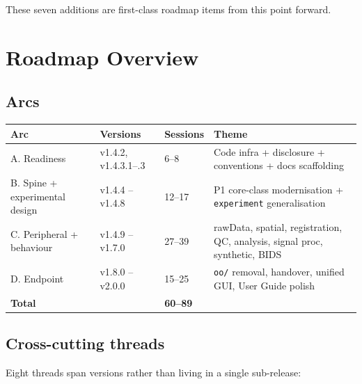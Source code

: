 \documentclass[11pt,a4paper]{article}
\begin{document}
These seven additions are first-class roadmap items from this point forward.

\section{Roadmap Overview}

\subsection{Arcs}

\begin{table}[h]
\centering
\begin{tabular}{llll}
\toprule
\textbf{Arc} & \textbf{Versions} & \textbf{Sessions} & \textbf{Theme} \\
\midrule
A. Readiness & v1.4.2, v1.4.3.1--.3 & 6--8 & Code infra + disclosure + conventions + docs scaffolding \\
B. Spine + experimental design & v1.4.4 -- v1.4.8 & 12--17 & P1 core-class modernisation + \texttt{experiment} generalisation \\
C. Peripheral + behaviour & v1.4.9 -- v1.7.0 & 27--39 & rawData, spatial, registration, QC, analysis, signal proc, synthetic, BIDS \\
D. Endpoint & v1.8.0 -- v2.0.0 & 15--25 & \texttt{oo/} removal, handover, unified GUI, User Guide polish \\
\midrule
\multicolumn{2}{l}{\textbf{Total}} & \textbf{60--89} & \\
\bottomrule
\end{tabular}
\end{table}

\subsection{Cross-cutting threads}

Eight threads span versions rather than living in a single sub-release:
\end{document}
